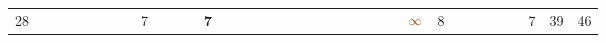 \begin{landscape}
\begin{table}
\begin{adjustwidth}{-2.6cm}{}
{\begin{tabular}{l|lllllllllllllllllllllllllllllllll|ll}
		28   &            &                                                                 &                                                                 &                                                                 &                                                                 &                                                                 &                                                                 & 7                                                               &                                                                 &                                                                 &                                                                 & \textbf{7}                                                      &                                                                 &                                                                 &                                                                 &                                                                 &                                                                 &                                                                 &                                                                 &                                                                 &                                                                 &                                                                 &                                                                 &                                                                 &                                                                 & $\textcolor[rgb]{0.541,0.29,0.043}{\infty}$ & 8                                                               &                                                                 &                                                                 &                                                                 &                                                                 &                                                                 & 7                                                               & 39         & 46          \\

\end{tabular}}
\end{adjustwidth}
\end{table}
\end{landscape}
